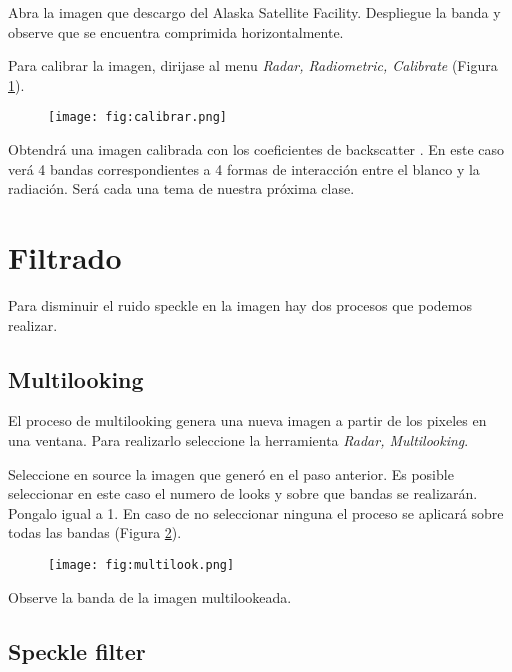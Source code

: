 Abra la imagen  que descargo del Alaska Satellite Facility. Despliegue la banda  y observe que se encuentra comprimida horizontalmente.

Para calibrar la imagen, dirijase al menu \emph{Radar, Radiometric, Calibrate} (Figura \ref{fig:calibrar}).

 \begin{figure}[h!]
     \centering
     \texttt{[image: fig:calibrar.png]}
     \caption{}
     \label{fig:calibrar}
 \end{figure}

 Obtendrá una imagen calibrada con los coeficientes de backscatter . En este caso verá 4 bandas correspondientes a 4 formas de interacción entre el blanco y la radiación. Será cada una tema de nuestra próxima clase.

 \section{Filtrado}

 Para disminuir el ruido speckle en la imagen hay dos procesos que podemos realizar.

 \subsection{Multilooking}

 El proceso de multilooking genera una nueva imagen a partir de los pixeles en una ventana. Para realizarlo seleccione la herramienta \emph{Radar, Multilooking}.

 Seleccione en source la imagen  que generó en el paso anterior. Es posible seleccionar en este caso el numero de looks y sobre que bandas se realizarán. Pongalo igual a 1. En caso de no seleccionar ninguna el proceso se aplicará sobre todas las bandas (Figura \ref{fig:multilook}).

\begin{figure}[h!]
    \centering
    \texttt{[image: fig:multilook.png]}
    \caption{}
    \label{fig:multilook}
\end{figure}

\begin{que}
Observe la banda  de la imagen multilookeada.
\end{que}


\subsection{Speckle filter}

